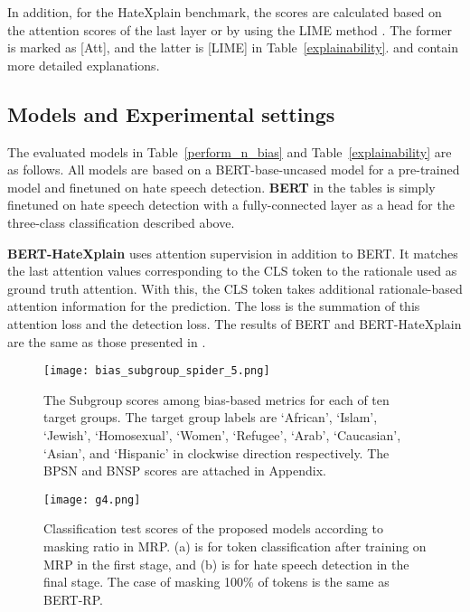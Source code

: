 \documentclass[11pt]{article}
\begin{document}
In addition, for the HateXplain benchmark, the scores are calculated based on the attention scores of the last layer or by using the LIME method \citep{ribeiro2016should}. The former is marked as [Att], and the latter is [LIME] in Table~\ref{explainability}. \citet{deyoung2019eraser} and \citet{mathew2020hatexplain} contain more detailed explanations. 

\subsection{Models and Experimental settings}

The evaluated models in Table~\ref{perform_n_bias} and Table~\ref{explainability} are as follows. All models are based on a BERT-base-uncased model for a pre-trained model and finetuned on hate speech detection. \textbf{BERT} in the tables is simply finetuned on hate speech detection with a fully-connected layer as a head for the three-class classification described above.

\textbf{BERT-HateXplain} uses attention supervision in addition to BERT. It matches the last attention values corresponding to the CLS token to the rationale used as ground truth attention. With this, the CLS token takes additional rationale-based attention information for the prediction. The loss is the summation of this attention loss and the detection loss. The results of BERT and BERT-HateXplain are the same as those presented in \citet{mathew2020hatexplain}.

\begin{figure}[!t] \begin{center}
    \texttt{[image: bias\_subgroup\_spider\_5.png]}
    \end{center}
    \caption{The Subgroup scores among bias-based metrics for each of ten target groups. The target group labels are `African', `Islam', `Jewish', `Homosexual', `Women', `Refugee', `Arab', `Caucasian', `Asian', and `Hispanic' in clockwise direction respectively. The BPSN and BNSP scores are attached in Appendix.}
    \label{fig:long}
    \label{fig:onecol}
\label{bias_graph_sub}
\end{figure}

\begin{figure}[!t]
    \centering
    \texttt{[image: g4.png]}
    \caption{Classification test scores of the proposed models according to masking ratio in MRP. (a) is for token classification after training on MRP in the first stage, and (b) is for hate speech detection in the final stage. The case of masking 100\% of tokens is the same as BERT-RP.}
    \label{fig:my_label}
    \label{fig:long}
    \label{fig:onecol}
\label{ratio_graph}
\end{figure}
\end{document}
